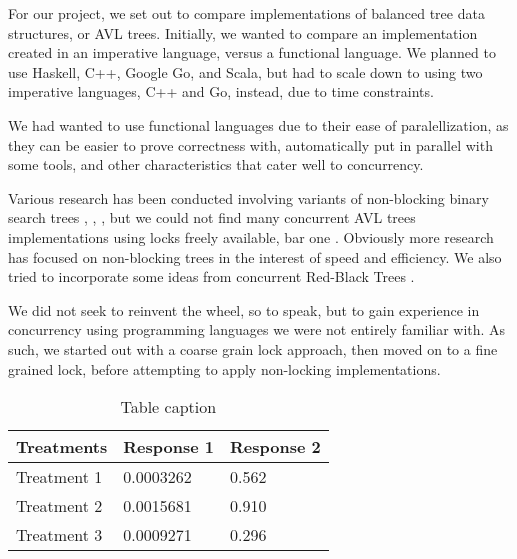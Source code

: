 \documentclass[finalreport,12pt]{elsarticle}
\begin{document}

For our project, we set out to compare implementations of balanced tree data structures, or AVL trees. Initially, we wanted to compare an implementation created in an imperative language, versus a functional language. We planned to use Haskell, C++, Google Go, and Scala, but had to scale down to using two imperative languages, C++ and Go, instead, due to time constraints. 

We had wanted to use functional languages due to their ease of paralellization, as they can be easier to prove correctness with, automatically put in parallel with some tools, and other characteristics that cater well to concurrency.

	Various research has been conducted involving variants of non-blocking binary search trees \cite{Bronson}, \cite{Brown}, \cite{Wicht}, but we could not find many concurrent AVL trees implementations using locks freely available, bar one \cite{Wicht}. Obviously more research has focused on non-blocking trees in the interest of speed and efficiency. We also tried to incorporate some ideas from concurrent Red-Black Trees \cite{Kim}.
	
	We did not seek to reinvent the wheel, so to speak, but to gain experience in concurrency using programming languages we were not entirely familiar with. As such, we started out with a coarse grain lock approach, then moved on to a fine grained lock, before attempting to apply non-locking implementations. 



\iffalse

\begin{itemize}
\item Bullet point one
\item Bullet point two
\end{itemize}

\begin{enumerate}
\item Numbered list item one
\item Numbered list item two
\end{enumerate}

\fi

\iffalse

\begin{table}[h]
\centering
\begin{tabular}{l l l}
\hline
\textbf{Treatments} & \textbf{Response 1} & \textbf{Response 2}\\
\hline
Treatment 1 & 0.0003262 & 0.562 \\
Treatment 2 & 0.0015681 & 0.910 \\
Treatment 3 & 0.0009271 & 0.296 \\
\hline
\end{tabular}
\caption{Table caption}
\end{table}
\end{document}
